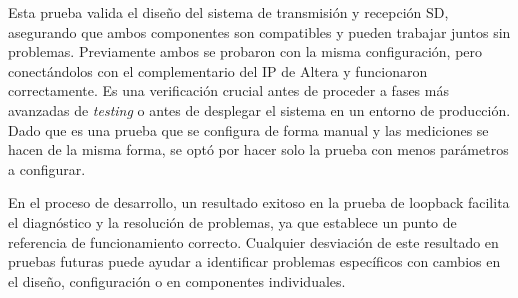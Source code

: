   Esta prueba valida el diseño del sistema de transmisión y recepción SD, asegurando
  que ambos componentes son compatibles y pueden trabajar juntos sin problemas.
  Previamente ambos se probaron con la misma configuración, pero conectándolos
  con el complementario del IP de Altera y funcionaron correctamente. Es una
  verificación crucial antes de proceder a fases más avanzadas de \textit{testing}
  o antes de desplegar el sistema en un entorno de producción. Dado que es una prueba
  que se configura de forma manual y las mediciones se hacen de la misma forma, se optó
  por hacer solo la prueba con menos parámetros a configurar.

  En el proceso de desarrollo, un resultado exitoso en la prueba de loopback facilita
  el diagnóstico y la resolución de problemas, ya que establece un punto de referencia
  de funcionamiento correcto. Cualquier desviación de este resultado en pruebas futuras
  puede ayudar a identificar problemas específicos con cambios en el diseño,
  configuración o en componentes individuales.


